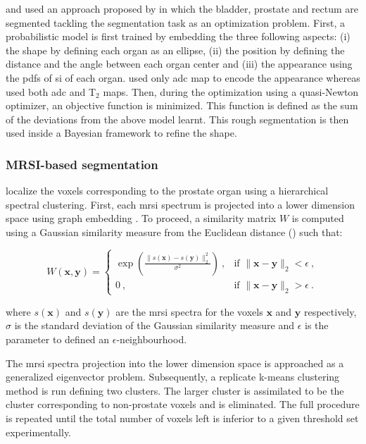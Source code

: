 \begin{enumerate}[leftmargin=*]
\cite{Litjens2011} and \cite{Vos2012} used an approach proposed by \cite{Huisman2010} in which the bladder, prostate and rectum are segmented tackling the segmentation task as an optimization problem. First, a probabilistic model is first trained by embedding the three following aspects: (i) the shape by defining each organ as an ellipse, (ii) the position by defining the distance and the angle between each organ center and (iii) the appearance using the \acp{pdf} of \ac{si} of each organ. \cite{Litjens2011} used only \ac{adc} map to encode the appearance whereas \cite{Vos2012} used both \ac{adc} and T$_2$ maps. Then, during the optimization using a quasi-Newton optimizer, an objective function is minimized. This function is defined as the sum of the deviations from the above model learnt. This rough segmentation is then used inside a Bayesian framework to refine the shape.

\end{enumerate}

\subsubsection{MRSI-based segmentation}

\cite{Tiwari2009} localize the voxels corresponding to the prostate organ using a hierarchical spectral clustering. First, each \ac{mrsi} spectrum is projected into a lower dimension space using graph embedding \cite{Shi2000}. To proceed, a similarity matrix $W$ is computed using a Gaussian similarity measure from the Euclidean distance (\cite{Belkin2001}) such that:

\begin{equation}
	W(\mathbf{x},\mathbf{y}) =
	\begin{cases}	
	 	\exp \left( \frac{\| s(\mathbf{x}) - s(\mathbf{y}) \|_2^2}{\sigma^2} \right) \ , & \text{if } \| \mathbf{x} - \mathbf{y} \|_2 < \epsilon \ , \\
	 	0 \ , & \text{if } \| \mathbf{x} - \mathbf{y} \|_2 > \epsilon \ .
	 \end{cases}
	\label{eq:ge1}
\end{equation}

\noindent where $s(\mathbf{x})$ and $s(\mathbf{y})$ are the \ac{mrsi} spectra for the voxels $\mathbf{x}$ and $\mathbf{y}$ respectively, $\sigma$ is the standard deviation of the Gaussian similarity measure and $\epsilon$ is the parameter to defined an $\epsilon$-neighbourhood.

The \ac{mrsi} spectra projection into the lower dimension space is approached as a generalized eigenvector problem. Subsequently,  a replicate k-means clustering method is run defining two clusters. The larger cluster is assimilated to be the cluster corresponding to non-prostate voxels and is eliminated. The full procedure is repeated until the total number of voxels left is inferior to a given threshold set experimentally.